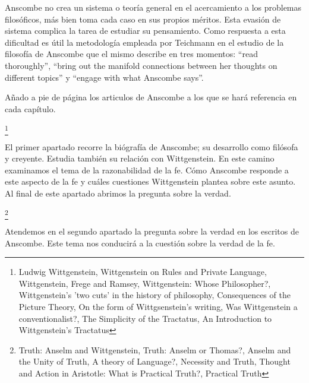 \documentclass[11pt]{article}
\begin{document}
{\begin{spacing}{1.5}
\begin{spacing}{1}
Anscombe no crea un sistema o teoría general en el acercamiento a los problemas filosóficos, más bien toma cada caso en sus propios méritos. Esta evasión de sistema complica la tarea de estudiar su pensamiento. Como respuesta a esta dificultad es útil la metodología empleada por Teichmann en el estudio de la filosofía de Anscombe que el mismo describe en tres momentos: ``read thoroughly'', ``bring out the manifold connections between her thoughts on different topics'' y ``engage with what Anscombe says''.

Añado a pie de página los articulos de Anscombe a los que se hará referencia en cada capítulo.

\end{spacing}
\footnote{
Ludwig Wittgenstein, 
Wittgenstein on Rules and Private Language, 
Wittgenstein, Frege and Ramsey, 
Wittgenstein: Whose Philosopher?, 
Wittgenstein's 'two cuts' in the history of philosophy, 
Consequences of the Picture Theory, 
On the form of Wittgsenstein's writing, 
Was Wittgenstein a conventionalist?, 
The Simplicity of the Tractatus, 
An Introduction to Wittgenstein's Tractatus
}

\begin{spacing}{1}
El primer apartado recorre la biógrafía de Anscombe; su desarrollo como filósofa y creyente. Estudia también su relación con Wittgenstein. En este camino examinamos el tema de la razonabilidad de la fe. Cómo Anscombe responde a este aspecto de la fe y cuáles cuestiones Wittgenstein plantea sobre este asunto. Al final de este apartado abrimos la pregunta sobre la verdad.
\end{spacing}

\footnote{
Truth: Anselm and Wittgenstein, 
Truth: Anselm or Thomas?, 
Anselm and the Unity of Truth, 
A theory of Language?, 
Necessity and Truth, 
Thought and Action in Aristotle: What is Practical Truth?, 
Practical Truth
}

\begin{spacing}{1}
Atendemos en el segundo apartado la pregunta sobre la verdad en los escritos de Anscombe. Este tema nos conducirá a la cuestión sobre la verdad de la fe.
\end{spacing}


\end{spacing}}
\end{document}
